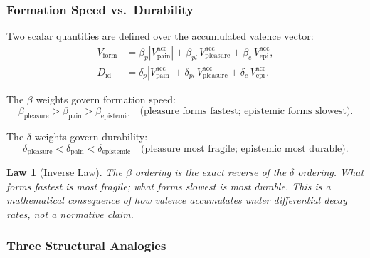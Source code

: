 \documentclass[12pt,a4paper]{article}
\newtheorem{law}{Law}[section]
\newcommand{\Vform}{V_{\mathrm{form}}}
\newcommand{\Diden}{D_{\mathrm{id}}}
\begin{document}
\subsubsection{Formation Speed vs.\ Durability}

Two scalar quantities are defined over the accumulated valence vector:
\begin{align}
  \Vform   &= \beta_p|V^{\mathrm{acc}}_{\mathrm{pain}}|
              + \beta_{pl}\,V^{\mathrm{acc}}_{\mathrm{pleasure}}
              + \beta_e\,V^{\mathrm{acc}}_{\mathrm{epi}},
              \label{eq:Vform}\\
  \Diden   &= \delta_p|V^{\mathrm{acc}}_{\mathrm{pain}}|
              + \delta_{pl}\,V^{\mathrm{acc}}_{\mathrm{pleasure}}
              + \delta_e\,V^{\mathrm{acc}}_{\mathrm{epi}}.
              \label{eq:Diden}
\end{align}

The $\beta$ weights govern formation speed:
\begin{equation}
  \beta_{\mathrm{pleasure}} > \beta_{\mathrm{pain}} > \beta_{\mathrm{epistemic}}
  \quad\text{(pleasure forms fastest; epistemic forms slowest).}
\end{equation}

The $\delta$ weights govern durability:
\begin{equation}
  \delta_{\mathrm{pleasure}} < \delta_{\mathrm{pain}} < \delta_{\mathrm{epistemic}}
  \quad\text{(pleasure most fragile; epistemic most durable).}
\end{equation}

\begin{law}[Inverse Law]
The $\beta$ ordering is the exact reverse of the $\delta$ ordering. What forms
fastest is most fragile; what forms slowest is most durable. This is a
mathematical consequence of how valence accumulates under differential decay
rates, not a normative claim.
\end{law}

\subsubsection{Three Structural Analogies}
\end{document}
